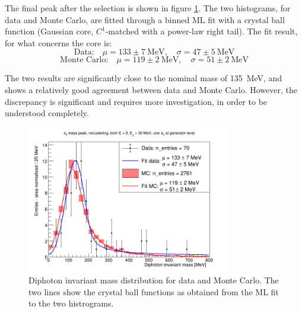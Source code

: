 \documentclass[a4paper]{article}
\begin{document}
The final peak after the selection is shown in figure \ref{fig:pi0_mass_peak}. The two histograms, for data and Monte Carlo, are fitted through a binned ML fit with a crystal ball function (Gaussian core, $C^1$-matched with a power-law right tail). The fit result, for what concerns the core is:
\[ \text{Data:} \quad \mu = 133 \pm 7~\text{MeV}, \quad \sigma = 47 \pm 5~\text{MeV} \]
\[ \text{Monte Carlo:} \quad \mu = 119 \pm 2~\text{MeV}, \quad \sigma = 51 \pm 2~\text{MeV} \]

The two results are significantly close to the nominal mass of 135~MeV, and shows a relatively good agreement between data and Monte Carlo. However, the discrepancy is significant and requires more investigation, in order to be understood completely.

\begin{figure}[!htbp]
\centering
\includegraphics[width=0.8\textwidth]{_fig/data_mc_pi0_mass_peak_crb_cut_on_second_shower.png}
\caption{Diphoton invariant mass distribution for data and Monte Carlo. The two lines show the crystal ball functions as obtained from the ML fit to the two histrograms.} 
\label{fig:pi0_mass_peak}
\end{figure}
\end{document}

